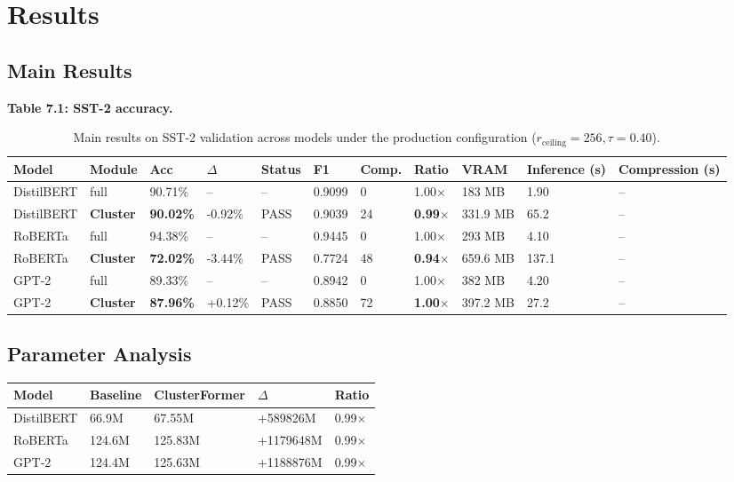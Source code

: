 \section{Results}

\subsection{Main Results}

\textbf{Table 7.1: SST-2 accuracy.}

\begin{table}[t]
\centering
\small
\begin{tabular}{lllllllllll}
\toprule
\textbf{Model} & \textbf{Module} & \textbf{Acc} & \textbf{$\Delta$} & \textbf{Status} & \textbf{F1} & \textbf{Comp.} & \textbf{Ratio} & \textbf{VRAM} & \textbf{Inference (s)} & \textbf{Compression (s)} \\
\midrule
DistilBERT & full & 90.71\% & -- & -- & 0.9099 & 0 & 1.00$\times$ & 183 MB & 1.90 & -- \\
DistilBERT & \textbf{Cluster} & \textbf{90.02\%} & -0.92\% & PASS & 0.9039 & 24 & \textbf{0.99$\times$} & 331.9 MB & 65.2 & -- \\
RoBERTa & full & 94.38\% & -- & -- & 0.9445 & 0 & 1.00$\times$ & 293 MB & 4.10 & -- \\
RoBERTa & \textbf{Cluster} & \textbf{72.02\%} & -3.44\% & PASS & 0.7724 & 48 & \textbf{0.94$\times$} & 659.6 MB & 137.1 & -- \\
GPT-2 & full & 89.33\% & -- & -- & 0.8942 & 0 & 1.00$\times$ & 382 MB & 4.20 & -- \\
GPT-2 & \textbf{Cluster} & \textbf{87.96\%} & +0.12\% & PASS & 0.8850 & 72 & \textbf{1.00$\times$} & 397.2 MB & 27.2 & -- \\
\bottomrule
\end{tabular}
\caption{Main results on SST-2 validation across models under the production configuration ($r_{\mathrm{ceiling}}=256, \tau=0.40$).}
\label{tab:main_sst2}
\end{table}

\subsection{Parameter Analysis}

\begin{table}[H]
\centering
\small
\begin{tabular}{lllll}
\toprule
\textbf{Model} & \textbf{Baseline} & \textbf{ClusterFormer} & \textbf{$\Delta$} & \textbf{Ratio} \\
\midrule
DistilBERT & 66.9M & 67.55M & +589826M & 0.99$\times$ \\
RoBERTa & 124.6M & 125.83M & +1179648M & 0.99$\times$ \\
GPT-2 & 124.4M & 125.63M & +1188876M & 0.99$\times$ \\
\bottomrule
\end{tabular}
\end{table}

